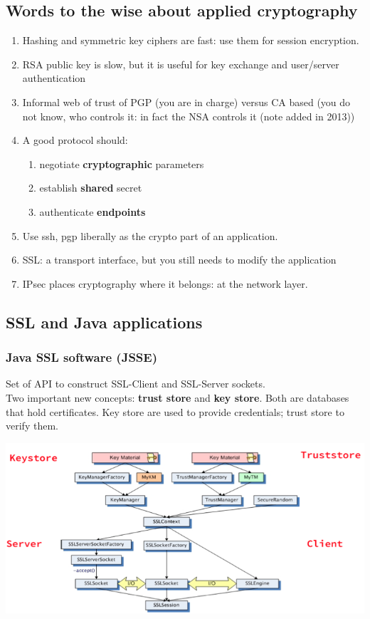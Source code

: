\documentclass[10pt]{article}
\begin{document}
\subsection{Words to the wise about applied cryptography}
\begin{enumerate}
	\item Hashing and symmetric key ciphers are fast: use them for session encryption.
	\item RSA public key is slow, but it is useful for key exchange and user/server authentication
	\item Informal web of trust of PGP (you are in charge) versus CA based (you do not know, who controls it: in fact the NSA controls it (note added in 2013))
	\item A good protocol should:
		\begin{enumerate}
			\item negotiate \textbf{cryptographic} parameters
			\item establish \textbf{shared} secret
			\item authenticate \textbf{endpoints}
		\end{enumerate}
	\item Use ssh, pgp liberally as the crypto part of an application.
	\item SSL: a transport interface, but you still needs to modify the application
	\item IPsec places cryptography where it belongs: at the network layer.
\end{enumerate}
\subsection{SSL and Java applications}
\subsubsection{Java SSL software (JSSE)}
Set of API to construct SSL-Client and SSL-Server sockets. \\
Two important new concepts: \textbf{trust store} and \textbf{key store}. Both are databases that hold certificates. Key store are used to provide credentials; trust store to verify them.
\begin{center}
	\includegraphics[scale=0.4]{ssl_class_diagram.png}
\end{center}
\end{document}

